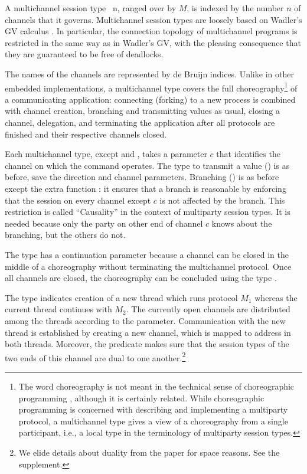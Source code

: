 \documentclass[acmsmall,screen]{acmart}
\begin{document}
\multiMSessionSignature

A multichannel session type {\AMSession~n}, ranged over by $M$, is indexed by the number $n$ of
channels that it governs. Multichannel session types are loosely based on Wadler's GV
calculus \cite{DBLP:journals/jfp/Wadler14}. In particular, the
connection topology of multichannel programs is restricted in the same
way as in Wadler's GV, with the pleasing
consequence that they are guaranteed to be free of deadlocks.

The names of the channels are represented by
de Bruijn indices. Unlike in other embedded implementations, a
multichannel type covers the full choreography\footnote{The word
  choreography is not meant in the technical sense of choreographic
  programming \cite{cruz-filipe23:_formal_theor_choreog_progr},
  although it is certainly related. While choreographic programming is
concerned with describing and implementing a multiparty protocol, a
multichannel type gives a view of a choreography from a single
participant, i.e., a local type in the terminology of multiparty
session types.} of a communicating
application: connecting (forking) to a new process is combined with channel creation, branching and transmitting values as usual, closing a
channel, delegation, and terminating the application after all
protocols are finished and their respective channels closed.

\multiMSession

Each multichannel type, except {\ACconnect} and {\ACterminate}, takes a parameter
$c$ that identifies the channel on which the command operates. 
The type to transmit a value (\ACtransmit) is as before, save the
direction and channel parameters. Branching (\ACbranch) is as before
except the extra function {\ACausality}: it ensures that a branch is
reasonable by enforcing that the session on every channel except $c$
is not affected by the branch. This restriction is called
``Causality'' in the context of multiparty session types. It is needed
because only the party on other end of channel $c$ knows about the
branching, but the others do not.

The {\ACclose} type has a continuation parameter because a channel
can be closed in the middle of a choreography without terminating the
multichannel protocol. Once all channels are closed, the choreography
can be concluded using the type {\ACterminate}.

The type {\ACconnect} indicates creation of a new thread which runs protocol $M_1$
whereas the current thread continues with $M_2$. The currently open
channels are distributed among the threads according to the {\ASplit}
parameter.
Communication with the new thread is established by 
creating a new channel, which is mapped to address {\Azero} in both
threads. Moreover, the {\ACheckDual} predicate makes sure that the
session types of the two ends of this channel are dual to one another.\footnote{We elide details about
  duality from the paper for space reasons. See the supplement.}
\end{document}
